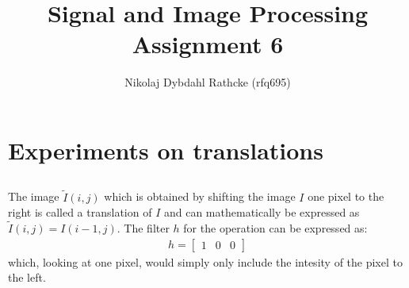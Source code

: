 \documentclass[a4paper]{article}
\author{Nikolaj Dybdahl Rathcke (rfq695)}
\title{Signal and Image Processing \\ Assignment 6}
\begin{document}
\maketitle

\section{Experiments on translations}
\subsection{}
The image $\widetilde{I}(i, j)$ which is obtained by shifting the image $I$ one pixel to the right is called a translation of $I$ and can mathematically be expressed as $\widetilde{I}(i, j)=I(i-1, j)$. The filter $h$ for the operation can be expressed as:
\begin{align*}
  h = \begin{bmatrix} 1 & 0 & 0\end{bmatrix}
\end{align*}
which, looking at one pixel, would simply only include the intesity of the pixel to the left.
\end{document}
